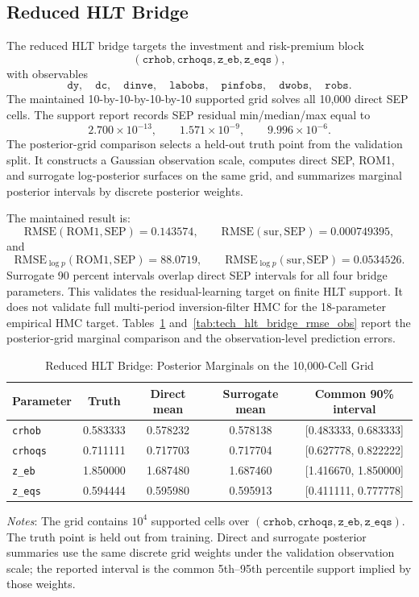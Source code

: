 \documentclass[12pt]{article}
\newcommand{\rom}{\mathrm{ROM1}}
\newcommand{\sep}{\mathrm{SEP}}
\newcommand{\sur}{\mathrm{sur}}
\newcommand{\techappendixnotes}[1]{%
  \par\smallskip
  \noindent\begin{minipage}{0.92\textwidth}%
  \footnotesize #1%
  \end{minipage}\par%
}
\begin{document}
\subsection{Reduced HLT Bridge}

The reduced HLT bridge targets the investment and risk-premium block
\[
  (\texttt{crhob},\texttt{crhoqs},\texttt{z\_eb},\texttt{z\_eqs}),
\]
with observables
\[
  \texttt{dy},\quad \texttt{dc},\quad \texttt{dinve},\quad
  \texttt{labobs},\quad \texttt{pinfobs},\quad \texttt{dwobs},\quad
  \texttt{robs}.
\]
The maintained 10-by-10-by-10-by-10 supported grid solves all 10,000 direct SEP
cells. The support report records SEP residual min/median/max equal to
\[
  2.700\times 10^{-13},\qquad
  1.571\times 10^{-9},\qquad
  9.996\times 10^{-6}.
\]
The posterior-grid comparison selects a held-out truth point from the validation
split. It constructs a Gaussian observation scale, computes direct SEP, ROM1,
and surrogate log-posterior surfaces on the same grid, and summarizes marginal
posterior intervals by discrete posterior weights.

The maintained result is:
\[
  \mathrm{RMSE}(\rom,\sep)=0.143574,\qquad
  \mathrm{RMSE}(\sur,\sep)=0.000749395,
\]
and
\[
  \mathrm{RMSE}_{\log p}(\rom,\sep)=88.0719,\qquad
  \mathrm{RMSE}_{\log p}(\sur,\sep)=0.0534526.
\]
Surrogate 90 percent intervals overlap direct SEP intervals for all four bridge
parameters. This validates the residual-learning target on finite HLT support.
It does not validate full multi-period inversion-filter HMC for the
18-parameter empirical HMC target. Tables~\ref{tab:tech_hlt_bridge_marginals}
and~\ref{tab:tech_hlt_bridge_rmse_obs} report the posterior-grid marginal
comparison and the observation-level prediction errors.

\begin{table}[htbp]
\centering
\caption{Reduced HLT Bridge: Posterior Marginals on the 10,000-Cell Grid}
\label{tab:tech_hlt_bridge_marginals}
\begin{tabular}{lcccc}
\toprule
Parameter & Truth & Direct mean & Surrogate mean & Common 90\% interval \\
\midrule
\texttt{crhob} & 0.583333 & 0.578232 & 0.578138 & [0.483333, 0.683333] \\
\texttt{crhoqs} & 0.711111 & 0.717703 & 0.717704 & [0.627778, 0.822222] \\
\texttt{z\_eb} & 1.850000 & 1.687480 & 1.687460 & [1.416670, 1.850000] \\
\texttt{z\_eqs} & 0.594444 & 0.595980 & 0.595913 & [0.411111, 0.777778] \\
\bottomrule
\end{tabular}
\techappendixnotes{\textit{Notes}: The grid contains
\(10^4\) supported cells over
\((\texttt{crhob},\texttt{crhoqs},\texttt{z\_eb},\texttt{z\_eqs})\). The truth
point is held out from training. Direct and surrogate posterior summaries use
the same discrete grid weights under the validation observation scale; the
reported interval is the common 5th--95th percentile support implied by those
weights.}
\end{table}
\end{document}
